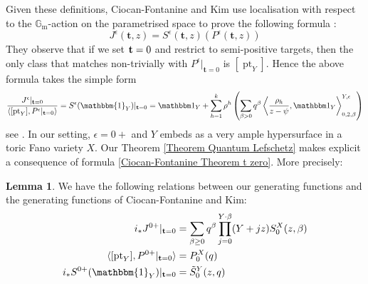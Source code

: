 \documentclass[11pt]{amsart}
\newcommand{\Gm}{\mathbb{G}_{\text{m}}}
\newcommand{\pt}{\operatorname{pt}}
\theoremstyle{definition}
\newtheorem{lem}[thm]{Lemma}
\theoremstyle{definition}
\begin{document}
Given these definitions, Ciocan-Fontanine and Kim use localisation with respect to the $\Gm$-action on the parametrised space to prove the following formula \cite[Theorem 5.4.1]{CF-K-wallcrossing}:
\[
 J^\epsilon(\mathbf{t},z)=S^\epsilon(\mathbf{t},z)(P^\epsilon(\mathbf{t},z))
\]
They observe that if we set ${\bf t}=0$ and restrict to semi-positive targets, then the only class that matches non-trivially with ${P^\epsilon}|_{\mathbf{t}=0}$ is $[\pt_Y]$. Hence the above formula takes the simple form
\begin{equation} \label{Ciocan-Fontanine Theorem t zero}
 \frac{J^\epsilon |_{{\bf t}=0}}{\langle [\pt_Y],  P^\epsilon|_{{\bf t}=0}\rangle}=S^\epsilon(\mathbbm{1}_Y)|_{\mathbf{t}=0} = \mathbbm 1_Y+\sum_{h=1}^k \rho^h \left(\sum_{\beta> 0}q^\beta\left\langle\frac{\rho_h}{z-\psi},\mathbbm 1_Y\right\rangle_{0,2,\beta}^{Y,\epsilon} \right)\end{equation}
see \cite[Corollary 5.5.1]{CF-K-wallcrossing}. In our setting, $\epsilon=0+$ and $Y$ embeds as a very ample hypersurface in a toric Fano variety $X$. Our Theorem \ref{Theorem Quantum Lefschetz} makes explicit a consequence of formula \eqref{Ciocan-Fontanine Theorem t zero}. More precisely:
\begin{lem} We have the following relations between our generating functions and the generating functions of Ciocan-Fontanine and Kim:
\begin{align}
\label{J epsilon equation} i_*J^{0+}|_{\mathbf{t}=0} & = \sum_{\beta \geq 0} q^\beta \prod_{j=0}^{Y \cdot \beta} (Y + jz) S_0^X(z,\beta) \\
\label{P epsilon equation} \langle [\pt_Y], P^{0+}|_{\mathbf{t}=0} \rangle & = P_0^X(q) \\
\label{S epsilon equation} i_*S^{0+}(\mathbbm{1}_Y)|_{\mathbf{t}=0} & = \tilde{S}^Y_0(z,q)
\end{align}
\end{lem}
\end{document}
